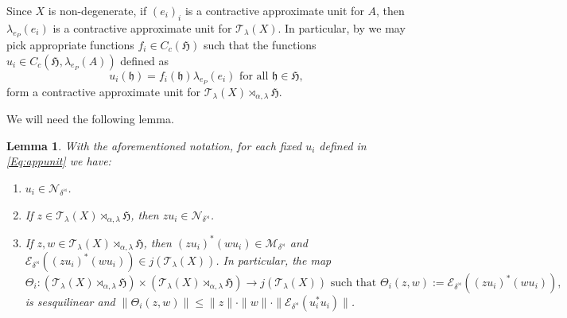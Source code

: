 \documentclass[11pt,final]{amsart}
\numberwithin{equation}{section}
\theoremstyle{plain}
\newtheorem{lemma}[theorem]{Lemma}
\theoremstyle{definition}
\theoremstyle{remark}
\newcommand{\E}{{\mathcal{E}}}
\newcommand{\M}{{\mathcal{M}}}
\newcommand{\N}{{\mathcal{N}}}
\newcommand{\T}{{\mathcal{T}}}
\def\al{\alpha}
\def\de{\delta}
\def\la{\lambda}
\newcommand{\fH}{{\mathfrak{H}}}
\newcommand{\fh}{{\mathfrak{h}}}
\newcommand{\foral}{\text{ for all }}
\begin{document}
Since $X$ is non-degenerate, if $(e_i)_i$ is a contractive approximate unit for $A$, then $\la_{e_P}(e_i)$ is a contractive approximate unit for $\T_\la(X)$. In particular, by \cite[Lemma~3.5]{KR19} we may pick appropriate functions $f_i \in C_c(\fH)$ such that the functions $u_i\in C_c(\fH,\la_{e_P}(A))$ defined as 
\begin{equation}\label{Eq:appunit}
u_i(\fh)=f_i(\fh)\la_{e_P}(e_i) \foral \fh\in \fH,
\end{equation}
form a contractive approximate unit for $\T_\la(X)\rtimes_{\al,\la}\fH$.

We will need the following lemma.

\begin{lemma}\label{L:local1}
With the aforementioned notation, for each fixed $u_i$ defined in \eqref{Eq:appunit} we have:
\begin{enumerate}
\item $u_i \in \N_{\de^\rtimes}$.
\item If $z\in\T_\la(X)\rtimes_{\al,\la}\fH$, then $z u_i \in \N_{\de^\rtimes}$.

\item If $z,w\in \T_\la(X)\rtimes_{\al,\la}\fH$, then
$(z u_i)^*(w u_i)\in\M_{\de^{\rtimes}}$ and
$\E_{\de^{\rtimes}}((z u_i)^*(w u_i))\in j(\T_\la(X))$.
In particular, the map
\[
\Theta_i \colon
(\T_\la(X)\rtimes_{\al,\la}\fH)\times
(\T_\la(X)\rtimes_{\al,\la}\fH)\to j(\T_\la(X))
\text{ such that }
\Theta_i(z,w)
:=
\E_{\de^{\rtimes}}((zu_i)^*(w u_i)),
\]
is sesquilinear and
$\|\Theta_i(z,w)\|
\leq
\|z\|\cdot \|w\|\cdot \|\E_{\de^\rtimes}(u_i^*u_i)\|$.

\end{enumerate}
\end{lemma}
\end{document}
